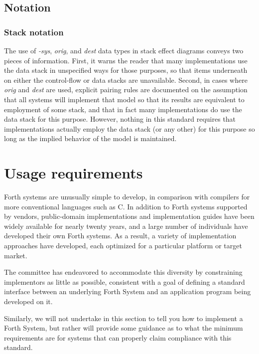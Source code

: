 \subsection{Notation} %

\addtocounter{subsubsection}{1}
\subsubsection{Stack notation} %

The use of \emph{-sys}, \emph{orig}, and \emph{dest} data types in
stack effect diagrams conveys two pieces of information. First, it
warns the reader that many implementations use the data stack in
unspecified ways for those purposes, so that items underneath on
either the control-flow or data stacks are unavailable. Second, in
cases where \emph{orig} and \emph{dest} are used, explicit pairing
rules are documented on the assumption that all systems will
implement that model so that its results are equivalent to employment
of some stack, and that in fact many implementations do use the data
stack for this purpose. However, nothing in this standard requires
that implementations actually employ the data stack (or any other)
for this purpose so long as the implied behavior of the model is
maintained.


\section{Usage requirements} %

Forth systems are unusually simple to develop, in comparison with
compilers for more conventional languages such as C. In addition to
Forth systems supported by vendors, public-domain implementations and
implementation guides have been widely available for nearly twenty
years, and a large number of individuals have developed their own
Forth systems. As a result, a variety of implementation approaches
have developed, each optimized for a particular platform or target
market.

The committee has endeavored to accommodate this diversity by
constraining implementors as little as possible, consistent with a
goal of defining a standard interface between an underlying Forth
System and an application program being developed on it.

Similarly, we will not undertake in this section to tell you how to
implement a Forth System, but rather will provide some guidance as
to what the minimum requirements are for systems that can properly
claim compliance with this standard.

